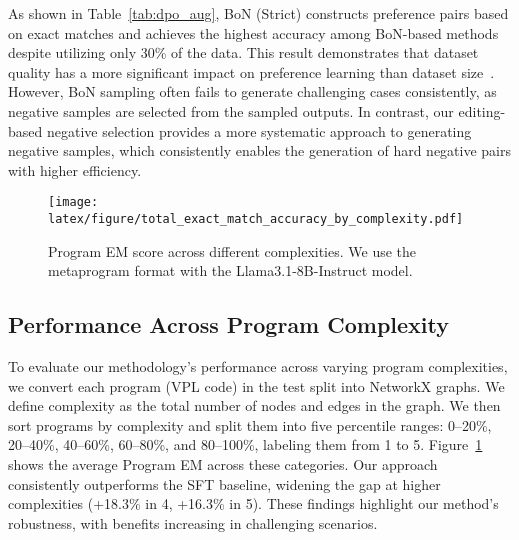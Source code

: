 As shown in Table~\ref{tab:dpo_aug}, BoN (Strict) constructs preference pairs based on exact matches and achieves the highest accuracy among BoN-based methods despite utilizing only 30\% of the data. This result demonstrates that dataset quality has a more significant impact on preference learning than dataset size~\cite{hou2024doesrlhfscaleexploring, kim2024aligninglargelanguagemodels}. However, BoN sampling often fails to generate challenging cases consistently, as negative samples are selected from the sampled outputs. In contrast, our editing-based negative selection provides a more systematic approach to generating negative samples, which consistently enables the generation of hard negative pairs with higher efficiency. 

\begin{figure}[!t]
    \centering
    \texttt{[image: latex/figure/total\_exact\_match\_accuracy\_by\_complexity.pdf]}
    \caption{Program EM score across different complexities. We use the metaprogram format with the Llama3.1-8B-Instruct model.}
    \label{fig:total_EM_trend_complexity}
\end{figure}
\subsection{\label{sec:difficulty}Performance Across Program Complexity}
To evaluate our methodology's performance across varying program complexities, we convert each program (VPL code) in the test split into NetworkX graphs. We define complexity as the total number of nodes and edges in the graph. We then sort programs by complexity and split them into five percentile ranges: 0–20\%, 20–40\%, 40–60\%, 60–80\%, and 80–100\%, labeling them from 1 to 5. Figure~\ref{fig:total_EM_trend_complexity} shows the average Program EM across these categories. Our approach consistently outperforms the SFT baseline, widening the gap at higher complexities (+18.3\% in 4, +16.3\% in 5). These findings highlight our method's robustness, with benefits increasing in challenging scenarios.